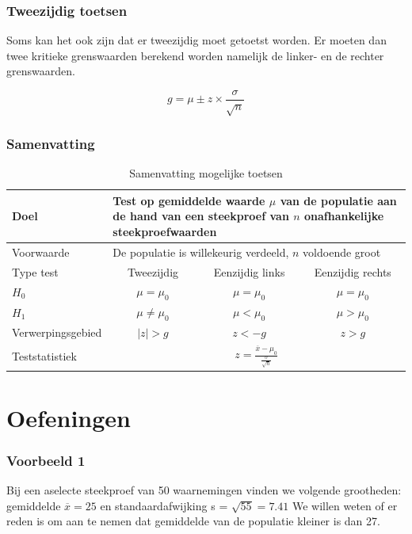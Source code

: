 \documentclass{beamer}
\begin{document}
\begin{frame}
  \frametitle{Tweezijdig toetsen}
  Soms kan het ook zijn dat er tweezijdig moet getoetst worden. Er moeten dan twee kritieke grenswaarden berekend worden namelijk de linker- en de rechter grenswaarden.

\begin{equation}
  g = \mu \pm z \times \frac{\sigma}{\sqrt{n}}
  \label{eq:kritiekeGrenswaarde}
\end{equation}
\end{frame}

\begin{frame}
  \frametitle{Samenvatting}

\begin{table}
  \centering
  \begin{tabular}{l|ccc}
    \toprule
    Doel              & \multicolumn{3}{l}{\parbox{.7\textwidth}{Test op gemiddelde waarde $\mu$ van de populatie aan de hand van een steekproef van $n$ onafhankelijke steekproefwaarden}} \\
    \midrule
    Voorwaarde        & \multicolumn{3}{l}{\parbox{.7\textwidth}{De populatie is willekeurig verdeeld, $n$ voldoende groot}} \\
    \midrule
    Type test         & Tweezijdig           & Eenzijdig links & Eenzijdig rechts \\
    \midrule
    $H_{0}$           & $\mu = \mu_{0}$      & $\mu = \mu_{0}$ & $\mu = \mu_{0}$  \\
    $H_{1}$           & $\mu \neq \mu_{0}$   & $\mu < \mu_{0}$ & $\mu > \mu_{0}$  \\
    Verwerpingsgebied & $\left|z\right| > g$ & $z< -g $        & $z>g$            \\
    Teststatistiek    & \multicolumn{3}{c}{$z = \frac{\overline{x} - \mu_{0}}{\frac{\sigma}{\sqrt{n}}}$} \\
    \bottomrule
  \end{tabular}
  \caption{Samenvatting mogelijke toetsen}
  \label{tab:toetsingsprocedures}
\end{table}
\end{frame}

\section{Oefeningen}
\begin{frame}
  \frametitle{Voorbeeld 1}
  Bij een aselecte steekproef van 50 waarnemingen vinden we volgende grootheden: gemiddelde $\overline{x} = 25$ en standaardafwijking s = $\sqrt{55} = 7.41$
  We willen weten of er reden is om aan te nemen dat gemiddelde van de populatie kleiner is dan 27.

\end{frame}
\end{document}
